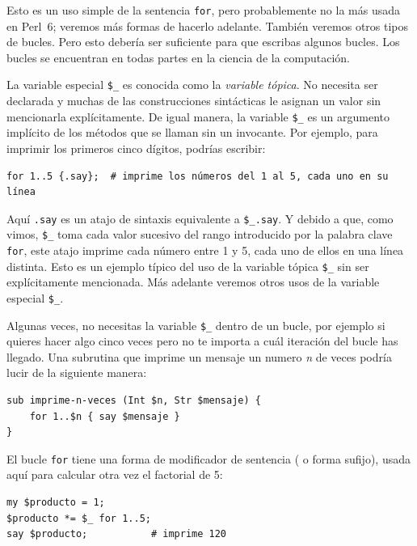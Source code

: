 Esto es un uso simple de la sentencia {\tt for},
pero probablemente no la más usada en Perl~6; veremos
más formas de hacerlo adelante. También veremos otros 
tipos de bucles. Pero esto debería ser suficiente para que 
escribas algunos bucles. Los bucles se encuentran en todas
partes en la ciencia de la computación.

La variable especial \verb|$_| es conocida como la 
\emph{variable tópica}. No necesita ser declarada y 
muchas de las construcciones sintácticas le asignan un valor
sin mencionarla explícitamente. De igual manera,
la variable \verb|$_| es un argumento implícito de los
métodos que se llaman sin un invocante. Por ejemplo,
para imprimir los primeros cinco dígitos, podrías
escribir:

\begin{verbatim}
for 1..5 {.say};  # imprime los números del 1 al 5, cada uno en su línea
\end{verbatim} 

Aquí {\tt .say} es un atajo de sintaxis equivalente a \verb|$_.say|.
Y debido a que, como vimos, \verb|$_| toma cada valor sucesivo del 
rango introducido por la palabra clave {\tt for}, este atajo imprime
cada número entre 1 y 5, cada uno de ellos en una línea distinta.
Esto es un ejemplo típico del uso de la variable tópica \verb|$_|
sin ser explícitamente mencionada. Más adelante veremos otros
usos de la variable especial \verb|$_|. 

Algunas veces, no necesitas la variable \verb|$_| dentro de un bucle,
por ejemplo si quieres hacer algo cinco veces pero no te importa a cuál
iteración del bucle has llegado. Una subrutina que imprime un mensaje 
un numero \emph{n} de veces podría lucir de la siguiente manera:

\begin{verbatim}
sub imprime-n-veces (Int $n, Str $mensaje) {
    for 1..$n { say $mensaje }
} 
\end{verbatim} 

El bucle {\tt for} tiene una forma de modificador de sentencia (
o forma sufijo), usada aquí para calcular otra vez el factorial de 5:

\begin{verbatim}
my $producto = 1;
$producto *= $_ for 1..5;
say $producto;           # imprime 120
\end{verbatim} 

